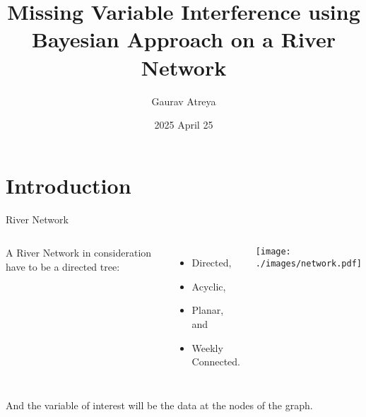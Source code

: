 \documentclass{beamer}
\title{Missing Variable Interference using Bayesian Approach on a River Network}
\author{Gaurav Atreya}
\institute{
 University of Cincinnati}
\date{2025 April 25}
\begin{document}
\begin{frame}
  \titlepage
\end{frame}

\section{Introduction}

\begin{frame}{River Network}
  \begin{columns}
    A River Network in consideration have to be a directed tree:
    \begin{itemize}
    \item Directed,
    \item Acyclic,
    \item Planar, and
    \item Weekly Connected.
    \end{itemize}

    \texttt{[image: ./images/network.pdf]}

  \end{columns}

  \vspace{0.5cm}
    
    And the variable of interest will be the data at the nodes of the graph.
  
\end{frame}
\end{document}
